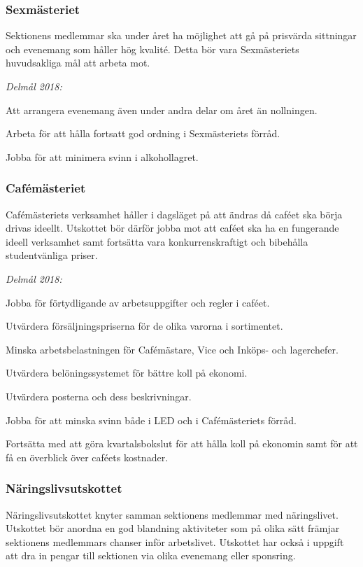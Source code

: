 \documentclass[../_main/handlingar.tex]{subfiles}
\begin{document}
\subsubsection*{Sexmästeriet}
Sektionens medlemmar ska under året ha möjlighet att gå på prisvärda sittningar och evenemang som håller hög kvalité. Detta bör vara Sexmästeriets huvudsakliga mål att arbeta mot.

\emph{Delmål 2018:}
\begin{dashlist}
	\item Att arrangera evenemang även under andra delar om året än nollningen.
	\item Arbeta för att hålla fortsatt god ordning i Sexmästeriets förråd.
	\item Jobba för att minimera svinn i alkohollagret.
\end{dashlist}

\subsubsection*{Cafémästeriet}
Cafémästeriets verksamhet håller i dagsläget på att ändras då caféet ska börja drivas ideellt. Utskottet bör därför jobba mot att caféet ska ha en fungerande ideell verksamhet samt fortsätta vara konkurrenskraftigt och bibehålla studentvänliga priser.

\emph{Delmål 2018:}
\begin{dashlist}
	\item Jobba för förtydligande av arbetsuppgifter och regler i caféet.
	\item Utvärdera försäljningspriserna för de olika varorna i sortimentet.
	\item Minska arbetsbelastningen för Cafémästare, Vice och Inköps- och lagerchefer.
	\item Utvärdera belöningssystemet för bättre koll på ekonomi.
	\item Utvärdera posterna och dess beskrivningar.
	\item Jobba för att minska svinn både i LED och i Cafémästeriets förråd.
	\item Fortsätta med att göra kvartalsbokslut för att hålla koll på ekonomin samt för att få en överblick över caféets kostnader.
\end{dashlist}

\subsubsection*{Näringslivsutskottet}
Näringslivsutskottet knyter samman sektionens medlemmar med näringslivet. Utskottet bör anordna en god blandning aktiviteter som på olika sätt främjar sektionens medlemmars chanser inför arbetslivet. Utskottet har också i uppgift att dra in pengar till sektionen via olika evenemang eller sponsring.
\end{document}
